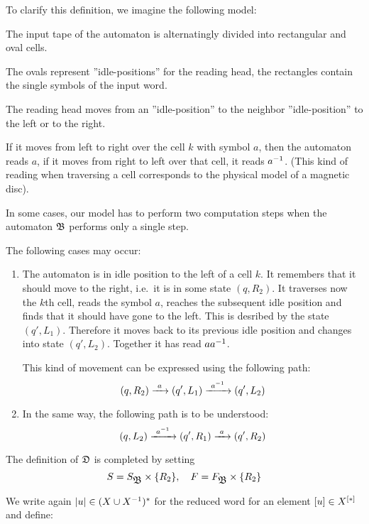 \bigskip
To clarify this definition, we imagine the following model:

The input tape of the automaton is alternatingly divided into rectangular and
oval cells.

\begin{center}

\end{center}

The ovals represent ''idle-positions'' for the reading head, the rectangles
contain the single symbols of the input word.

The reading head moves from an ''idle-position'' to the neighbor
''idle-position'' to the left or to the right.

If it moves from left to right over the cell $k$ with symbol $a$, then the
automaton reads $a$, if it moves from right to left over that cell, it reads
${{a}^{-1}}$. (This kind of reading when traversing a cell corresponds
to the physical model of a magnetic disc).

In some cases, our model has to perform two computation steps when the
automaton $\mbox{$\mathfrak{B}$}$ performs only a single step.

The following cases may occur:

\begin{enumerate}
  \item The automaton is in idle position to the left of a cell $k$. It
  remembers that it should move to the right, i.e.\ it is in some state $(q,
  R_2)$. It traverses now the $k$th cell, reads the symbol $a$, reaches the
  subsequent idle position and finds that it should have gone to the left. This
  is desribed by the state $(q', L_1)$. Therefore it moves back to its previous
  idle position and changes into state $(q', L_2)$. Together it has read $a
  {{a}^{-1}}$.
  
  This kind of movement can be expressed using the following path:
  \[ (q, R_2) \xrightarrow{\ {a}\ } (q', L_1) \xrightarrow{\ {{{a}^{-1}}}\ } (q', L_2) \]
  
  \item In the same way, the following path is to be understood:
  \[ (q, L_2) \xrightarrow{\ {{{a}^{-1}}}\ } (q', R_1) \xrightarrow{\ {a}\ } (q', R_2) \]
\end{enumerate}

The definition of $\mbox{$\mathfrak{D}$}$ is completed by setting
\[ S = S_{\mbox{$\mathfrak{B}$}} \times \mbox{$\{R_2\}$},\quad F = F_{\mbox{$\mathfrak{B}$}} \times \mbox{$\{R_2\}$} \]

We write again $|u| \in (X \cup {X}^{-1})^*$ for the reduced word for an element
$[u] \in \mbox{${X}^{[*]}$}$ and define:

